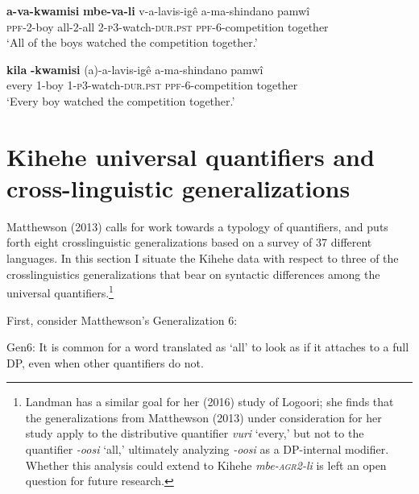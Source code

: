 \documentclass[letterpaper, 12pt]{article}
\begin{document}
\begin{exe}

\ex  \label{ex:kaspercushman:competition} \begin{xlist}

\ex \gll \textbf{a-va-kwamisi} \textbf{mbe-va-li} v-a-lavis-ig\^e a-ma-shindano pamw\^i \\
\textsc{ppf}-2-boy all-2-all 2-\textsc{p3}-watch-\textsc{dur.pst} \textsc{ppf}-6-competition together\\
`All of the boys watched the competition together.'\\

\vspace{5mm}

\ex \label{ex:kaspercushman:everytogether} \gll * \textbf{kila} \textbf{-kwamisi} (a)-a-lavis-ig\^e a-ma-shindano pamw\^i \\
{} every 1-boy 1-\textsc{p3}-watch-\textsc{dur.pst} \textsc{ppf}-6-competition together \\
`Every boy watched the competition together.'

\end{xlist}
\end{exe}

 

\section{Kihehe universal quantifiers and cross-linguistic generalizations}  \label{ex:kaspercushman:type}

Matthewson (2013) calls for work towards a typology of quantifiers, and puts forth eight crosslinguistic generalizations based on a survey of 37 different languages. In this section I situate the Kihehe data with respect to three of the crosslinguistics generalizations that bear on syntactic differences among the universal quantifiers.\footnote{Landman has a similar goal for her (2016) study of Logoori; she finds that the generalizations from Matthewson (2013) under consideration for her study apply to the distributive quantifier \textit{vuri} `every,' but not to the quantifier \textit{-oosi} `all,' ultimately analyzing \textit{-oosi} as a DP-internal modifier. Whether this analysis could extend to Kihehe \textit{mbe-\textsc{agr2}-li} is left an open question for future research.}  



First, consider Matthewson's Generalization 6:

\begin{exe}
\singlespacing
\ex Gen6: It is common for a word translated as `all' to look as if it attaches to a full DP, even when other quantifiers do not. \cite[p. 35]{matthewson13} \\
\end{exe}
\end{document}
